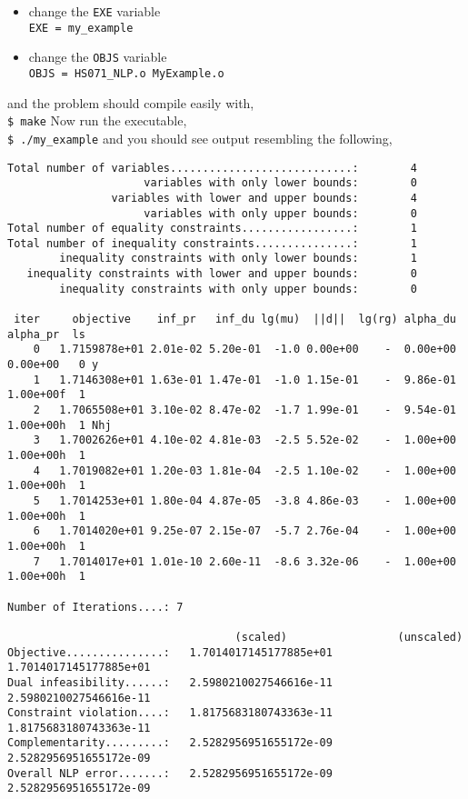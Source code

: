 \documentclass[letter,10pt]{article}
\begin{document}
\begin{itemize}
\item change the {\tt EXE} variable \\
{\tt EXE = my\_example}
\item change the {\tt OBJS} variable \\
{\tt OBJS = HS071\_NLP.o MyExample.o}
\end{itemize}
and the problem should compile easily with, \\
{\tt \$ make}
Now run the executable,\\ 
{\tt \$ ./my\_example}
and you should see output resembling the following,
\begin{footnotesize}
\begin{verbatim}
Total number of variables............................:        4
                     variables with only lower bounds:        0
                variables with lower and upper bounds:        4
                     variables with only upper bounds:        0
Total number of equality constraints.................:        1
Total number of inequality constraints...............:        1
        inequality constraints with only lower bounds:        1
   inequality constraints with lower and upper bounds:        0
        inequality constraints with only upper bounds:        0
 
 iter     objective    inf_pr   inf_du lg(mu)  ||d||  lg(rg) alpha_du alpha_pr  ls
    0   1.7159878e+01 2.01e-02 5.20e-01  -1.0 0.00e+00    -  0.00e+00 0.00e+00   0 y
    1   1.7146308e+01 1.63e-01 1.47e-01  -1.0 1.15e-01    -  9.86e-01 1.00e+00f  1
    2   1.7065508e+01 3.10e-02 8.47e-02  -1.7 1.99e-01    -  9.54e-01 1.00e+00h  1 Nhj
    3   1.7002626e+01 4.10e-02 4.81e-03  -2.5 5.52e-02    -  1.00e+00 1.00e+00h  1
    4   1.7019082e+01 1.20e-03 1.81e-04  -2.5 1.10e-02    -  1.00e+00 1.00e+00h  1
    5   1.7014253e+01 1.80e-04 4.87e-05  -3.8 4.86e-03    -  1.00e+00 1.00e+00h  1
    6   1.7014020e+01 9.25e-07 2.15e-07  -5.7 2.76e-04    -  1.00e+00 1.00e+00h  1
    7   1.7014017e+01 1.01e-10 2.60e-11  -8.6 3.32e-06    -  1.00e+00 1.00e+00h  1
 
Number of Iterations....: 7
 
                                   (scaled)                 (unscaled)
Objective...............:   1.7014017145177885e+01    1.7014017145177885e+01
Dual infeasibility......:   2.5980210027546616e-11    2.5980210027546616e-11
Constraint violation....:   1.8175683180743363e-11    1.8175683180743363e-11
Complementarity.........:   2.5282956951655172e-09    2.5282956951655172e-09
Overall NLP error.......:   2.5282956951655172e-09    2.5282956951655172e-09
 

\end{verbatim}
\end{footnotesize}
\end{document}
